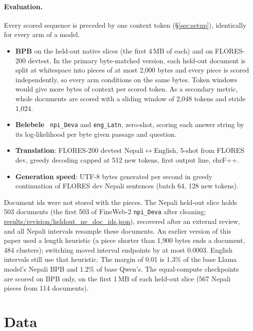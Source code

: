 \paragraph{Evaluation.} Every scored sequence is preceded by one context token (\S\ref{sec:setup}), identically for every arm of a model.
\begin{itemize}
  \setlength\itemsep{0pt}
  \item \textbf{BPB} on the held-out native slices (the first 4\,MB of each) and on FLORES-200 devtest. In the primary byte-matched version, each held-out document is split at whitespace into pieces of at most 2{,}000 bytes and every piece is scored independently, so every arm conditions on the same bytes. Token windows would give \RII{} more bytes of context per scored token. As a secondary metric, whole documents are scored with a sliding window of 2{,}048 tokens and stride 1{,}024.
  \item \textbf{Belebele}~\citep{bandarkar-etal-2024-belebele} \texttt{npi\_Deva} and \texttt{eng\_Latn}, zero-shot, scoring each answer string by its log-likelihood per byte given passage and question.
  \item \textbf{Translation}: FLORES-200 devtest Nepali$\leftrightarrow$English, 5-shot from FLORES dev, greedy decoding capped at 512 new tokens, first output line, chrF++.
  \item \textbf{Generation speed}: UTF-8 bytes generated per second in greedy continuation of FLORES dev Nepali sentences (batch 64, 128 new tokens).
\end{itemize}
Document ids were not stored with the pieces. The Nepali held-out slice holds 503 documents (the first 503 of FineWeb-2 \texttt{npi\_Deva} after cleaning; \url{results/revision/heldout_ne_doc_ids.json}), recovered after an external review, and all Nepali intervals resample these documents. An earlier version of this paper used a length heuristic (a piece shorter than 1{,}900 bytes ends a document, 484 clusters); switching moved interval endpoints by at most $0.0003$. English intervals still use that heuristic. The margin of 0.01 is 1.3\% of the base Llama model's Nepali BPB and 1.2\% of base Qwen's. The equal-compute checkpoints are scored on BPB only, on the first 1\,MB of each held-out slice (567 Nepali pieces from 114 documents).

\section{Data}
\label{app:data}

